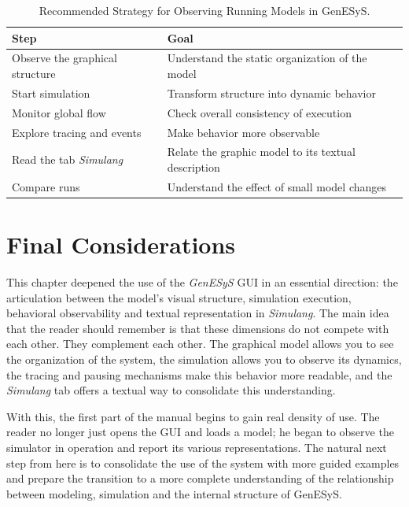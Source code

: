 \begin{table}[htbp]
\centering
\caption{Recommended Strategy for Observing Running Models in GenESyS.}
 \label{tab:cap5_estrategia_observacao_execucao}
\small
 \begin{tabular}{|p{4.3cm}|p{6.9cm}|}
\hline
\textbf{Step} & \textbf{Goal} \\
\hline
Observe the graphical structure & Understand the static organization of the model \\
\hline
Start simulation & Transform structure into dynamic behavior \\
\hline
Monitor global flow & Check overall consistency of execution \\
\hline
Explore tracing and events & Make behavior more observable \\
\hline
Read the tab \textit{Simulang} & Relate the graphic model to its textual description \\
\hline
Compare runs & Understand the effect of small model changes \\
\hline
 \end{tabular}
\end{table}

\section{Final Considerations}
\label{sec:cap5_consideracoes_finais}

This chapter deepened the use of the \textit{GenESyS} GUI in an essential direction: the articulation between the model's visual structure, simulation execution, behavioral observability and textual representation in \textit{Simulang}. The main idea that the reader should remember is that these dimensions do not compete with each other. They complement each other. The graphical model allows you to see the organization of the system, the simulation allows you to observe its dynamics, the tracing and pausing mechanisms make this behavior more readable, and the \textit{Simulang} tab offers a textual way to consolidate this understanding.

With this, the first part of the manual begins to gain real density of use. The reader no longer just opens the GUI and loads a model; he began to observe the simulator in operation and report its various representations. The natural next step from here is to consolidate the use of the system with more guided examples and prepare the transition to a more complete understanding of the relationship between modeling, simulation and the internal structure of GenESyS.

